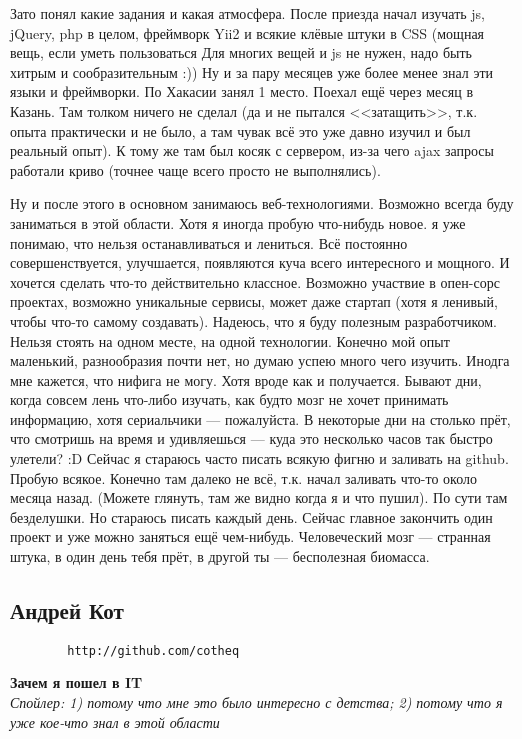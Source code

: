 \documentclass[14pt,a4paper,oneside]{extbook}
\begin{document}
		Зато понял какие задания и какая атмосфера. После приезда начал изучать js, jQuery, php в целом, фреймворк Yii2 и всякие клёвые штуки в CSS (мощная вещь, если уметь пользоваться Для многих вещей и js не нужен, надо быть хитрым и сообразительным :))
		Ну и за пару месяцев уже более менее знал эти языки и фреймворки.
		По Хакасии занял 1 место. Поехал ещё через месяц в Казань. Там толком ничего не сделал (да и не пытался <<затащить>>, т.к. опыта практически и не было, а там чувак всё это уже давно изучил и был реальный опыт).
		К тому же там был косяк с сервером, из-за чего ajax запросы работали криво (точнее чаще всего просто не выполнялись).
		
		Ну и после этого в основном занимаюсь веб-технологиями. Возможно всегда буду заниматься в этой области. Хотя я иногда пробую что-нибудь новое. я уже понимаю, что нельзя останавливаться и лениться.
		Всё постоянно совершенствуется, улучшается, появляются куча всего интересного и мощного. И хочется сделать что-то действительно классное.
		Возможно участвие в опен-сорс проектах, возможно уникальные сервисы, может даже стартап (хотя я ленивый, чтобы что-то самому создавать). 
		Надеюсь, что я буду полезным разработчиком. 
		Нельзя стоять на одном месте, на одной технологии. Конечно мой опыт маленький, разнообразия почти нет, но думаю успею много чего изучить.
		Инодга мне кажется, что нифига не могу. Хотя вроде как и получается. Бывают дни, когда совсем лень что-либо изучать, как будто мозг не хочет принимать информацию, хотя сериальчики --- пожалуйста.
		В некоторые дни на столько прёт, что смотришь на время и удивляешься --- куда это несколько часов так быстро улетели? :D
		Сейчас я стараюсь часто писать всякую фигню и заливать на github. Пробую всякое. Конечно там далеко не всё, т.к. начал заливать что-то около месяца назад. (Можете глянуть, там же видно когда я и что пушил).
		По сути там безделушки. Но стараюсь писать каждый день. Сейчас главное закончить один проект и уже можно заняться ещё чем-нибудь. 
		Человеческий мозг --- странная штука, в один день тебя прёт, в другой ты --- бесполезная биомасса. 
		
		\subsection{Андрей Кот}
		\begin{verbatim}
		http://github.com/cotheq
		\end{verbatim}
		
		\noindent\textbf{Зачем я пошел в IT}\\
		\noindent\textit{Спойлер: 1) потому что мне это было интересно с детства; 2) потому что я уже кое-что знал в этой области}
		
\end{document}
